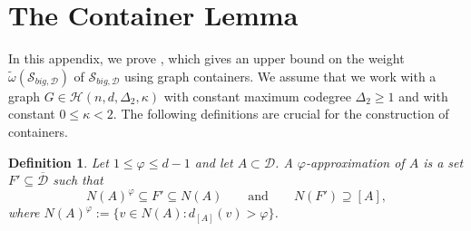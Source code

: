\documentclass[reqno,a4paper,11pt]{amsart}
\newtheorem{definition}[theorem]{Definition}
\newcommand{\cD}{\mathcal{D}}
\newcommand{\cH}{\mathcal{H}}
\newcommand{\cS}{\mathcal{S}}
\newcommand{\ex}{\kappa}
\newcommand{\codeg}{\Delta_2}
\begin{document}
\section{The Container Lemma}\label{sec:appendix_containers}
In this appendix, we prove , which gives an upper bound on the weight $\tilde{\omega}(\cS_{big, \cD})$ of $\cS_{big, \cD}$ using graph containers. 
We assume that we work with a graph $G\in\cH(n,d,\codeg,\ex)$ with constant maximum codegree $\codeg \geq 1$ and with constant $0 \leq \ex<2$. The following definitions are crucial for the construction of containers.

\begin{definition}\label{def:phi_approx}
    Let $1\leq \varphi\leq d-1$ and let $A\subset \cD$. A \textit{$\varphi$-approximation} of $A$ is a set $F'\subseteq \overline{\cD}$ such that
    \begin{equation*}
        N(A)^{\varphi}\subseteq F' \subseteq N(A)\qquad \text{and} \qquad N(F')\supseteq [A],
    \end{equation*}
    where $N(A)^{\varphi}:=\{v\in N(A): d_{[A]}(v)> \varphi\}$.
\end{definition}
\end{document}
